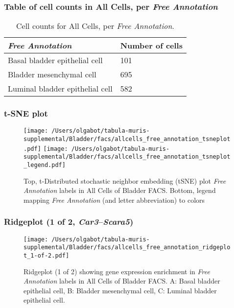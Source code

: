 \subsubsection{Table of cell counts in All Cells, per \emph{Free Annotation}}\begin{table}[h]
\centering
\label{my-label}
\begin{tabular}{@{}ll@{}}
\toprule

\emph{Free Annotation}& Number of cells \\ \midrule
Basal bladder epithelial cell & 101 \\

Bladder mesenchymal cell & 695 \\

Luminal bladder epithelial cell & 582 \\
\bottomrule
\end{tabular}
\caption{Cell counts for All Cells, per \emph{Free Annotation}.}
\end{table}

\clearpage
\subsubsection{t-SNE plot}
\begin{figure}[h]
\centering
\texttt{[image: /Users/olgabot/tabula-muris-supplemental/Bladder/facs/allcells\_free\_annotation\_tsneplot.pdf]}
\texttt{[image: /Users/olgabot/tabula-muris-supplemental/Bladder/facs/allcells\_free\_annotation\_tsneplot\_legend.pdf]}
\caption{Top, t-Distributed stochastic neighbor embedding (tSNE) plot  \emph{Free Annotation} labels in All Cells of Bladder FACS. Bottom, legend mapping \emph{Free Annotation} (and letter abbreviation) to colors}
\end{figure}


\clearpage

\subsubsection{Ridgeplot (1 of 2, \emph{Car3}--\emph{Scara5})}
\begin{figure}[h]
\centering
\texttt{[image: /Users/olgabot/tabula-muris-supplemental/Bladder/facs/allcells\_free\_annotation\_ridgeplot\_1-of-2.pdf]}

\caption{ Ridgeplot (1 of 2)  showing gene expression enrichment in \emph{Free Annotation} labels in All Cells of Bladder FACS. A: Basal bladder epithelial cell, B: Bladder mesenchymal cell, C: Luminal bladder epithelial cell.}
\end{figure}


